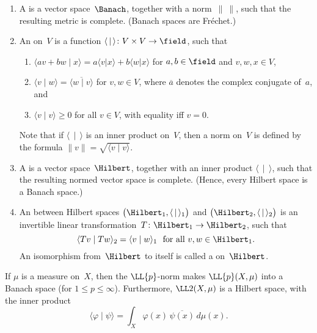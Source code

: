 \begin{defns}
\begin{enumerate}
	\item A  is a vector space~$\Banach$, together
	with a norm~$\| \ \|$, such that the resulting metric is complete.
	 (Banach spaces are Fréchet.)
	
	\item An  on~$V$ is a function $\langle \, \mid \, \rangle \colon V \times V \to \field$, such that
		\begin{enumerate}
		\item $\langle a v + b w \mid x \rangle = a \langle v | x \rangle + b \langle w | x \rangle$ for $a,b \in \field$ and $v,w,x \in V$,
		\item $\langle v \mid w \rangle = \overline{\langle w \mid v \rangle}$ for $v,w \in V$, where $\overline{a}$ denotes the complex conjugate of~$a$,
		and
		\item $\langle v \mid v \rangle \ge 0$ for all $v \in V$, with equality iff $v = 0$.
		\end{enumerate}
	Note that if $\langle \, \mid \, \rangle$ is an inner product on~$V$, then a norm on~$V$ is defined by the formula $\|v\| = \sqrt{\langle v \mid v \rangle}$.
	
	\item A  is a vector space~$\Hilbert$, 
	together with an inner product $\langle \, \mid \, \rangle$, such that the resulting normed vector space is complete. (Hence, every Hilbert space is a Banach space.)
	
	\item An  between Hilbert spaces $\bigl( \Hilbert_1, \langle \, \mid \, \rangle_1 \bigr)$ and $\bigl( \Hilbert_2, \langle \, \mid \, \rangle_2 \bigr)$ is an invertible linear transformation~$T \colon \Hilbert_1 \to \Hilbert_2$, such that 
		$$ \text{$\langle Tv \mid Tw \rangle_2 = \langle v \mid w \rangle_1$ 
		\ for all $v,w \in \Hilbert_1$} .$$
		An isomorphism from~$\Hilbert$ to itself is called a  on~$\Hilbert$.

	\end{enumerate}
\end{defns}

\begin{eg}
If $\mu$ is a measure on~$X$, then the $\LL{p}$-norm makes $\LL{p}(X,\mu)$ into a Banach space (for $1 \le p \le \infty$). Furthermore, $\LL2(X,\mu)$ is a Hilbert space, with the inner product
	$$ \langle \varphi \mid \psi \rangle = \int_X \varphi(x) \, \overline{\psi(x)} \, d\mu(x) .$$
\end{eg}

